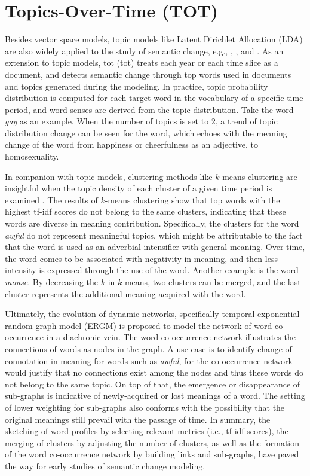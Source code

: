 \section{Topics-Over-Time (TOT)}
Besides vector space models, topic models like Latent Dirichlet Allocation (LDA) are also widely applied to the study of semantic change, e.g., \textcite{wang2006topics}, \textcite{wijaya2011understanding}, and \textcite{hengchen2017phd}. As an extension to topic models, \acrlong{tot} (\acrshort{tot}) treats each year or each time slice as a document, and detects semantic change through top words used in documents and topics generated during the modeling. In practice, topic probability distribution is computed for each target word in the vocabulary of a specific time period, and word senses are derived from the topic distribution. Take the word \textit{gay} as an example. When the number of topics is set to 2, a trend of topic distribution change can be seen for the word, which echoes with the meaning change of the word from happiness or cheerfulness as an adjective, to homosexuality.

In companion with topic models, clustering methods like $k$-means clustering are insightful when the topic density of each cluster of a given time period is examined \parencite{wijaya2011understanding}. The results of $k$-means clustering show that top words with the highest tf-idf scores do not belong to the same clusters, indicating that these words are diverse in meaning contribution. Specifically, the clusters for the word \textit{awful} do not represent meaningful topics, which might be attributable to the fact that the word is used as an adverbial intensifier with general meaning. Over time, the word comes to be associated with negativity in meaning, and then less intensity is expressed through the use of the word. Another example is the word \textit{mouse}. By decreasing the $k$ in $k$-means, two clusters can be merged, and the last cluster represents the additional meaning acquired with the word.

Ultimately, the evolution of dynamic networks, specifically temporal exponential random graph model (ERGM) \parencite{robins2007introduction,wijaya2011understanding} is proposed to model the network of word co-occurrence in a diachronic vein. The word co-occurrence network illustrates the connections of words as nodes in the graph. A use case is to identify change of connotation in meaning for words such as \textit{awful}, for the co-occurrence network would justify that no connections exist among the nodes and thus these words do not belong to the same topic. On top of that, the emergence or disappearance of sub-graphs is indicative of newly-acquired or lost meanings of a word. The setting of lower weighting for sub-graphs also conforms with the possibility that the original meanings still prevail with the passage of time. In summary, the sketching of word profiles by selecting relevant metrics (i.e., tf-idf scores), the merging of clusters by adjusting the number of clusters, as well as the formation of the word co-occurrence network by building links and sub-graphs, have paved the way for early studies of semantic change modeling.

